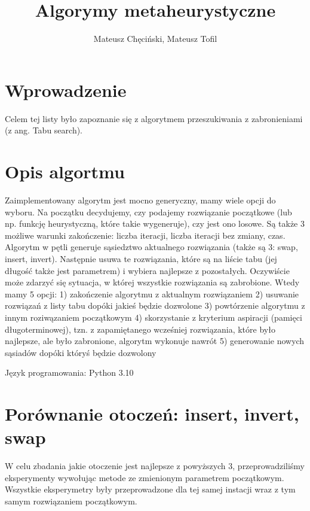 \documentclass{article}
\begin{document}
    \begin{titlepage}
        \title{Algorymy metaheurystyczne}
        \author{Mateusz Chęciński, Mateusz Tofil}
        \maketitle
    \end{titlepage}

    \section{Wprowadzenie}

    Celem tej listy było zapoznanie się z algorytmem przeszukiwania z
    zabronieniami (z ang. Tabu search). 

    \section{Opis algortmu}

   Zaimplementowany algorytm jest mocno generyczny, mamy wiele opcji do wyboru.
   Na początku decydujemy, czy podajemy rozwiązanie początkowe 
   (lub np. funkcję heurystyczną, które takie wygeneruje), czy jest 
   ono losowe. Są także 3 możliwe warunki zakończenie: 
   liczba iteracji, liczba iteracji bez zmiany, czas.
   Algorytm w pętli generuje sąsiedztwo aktualnego rozwiązania
   (także są 3: swap, insert, invert). Następnie usuwa te rozwiązania,
   które są na liście tabu (jej długość także jest parametrem) i wybiera
   najlepsze z pozostałych. Oczywiście może zdarzyć się sytuacja, w której
   wszystkie rozwiązania są zabrobione. Wtedy mamy 5 opcji: 
   1) zakończenie algorytmu z aktualnym rozwiązaniem
   2) usuwanie rozwiązań z listy tabu dopóki jakieś będzie dozwolone
   3) powtórzenie algorytmu z innym roziwązaniem początkowym
   4) skorzystanie z kryterium aspiracji (pamięci długoterminowej), tzn.
   z zapamiętanego wcześniej rozwiązania, które było najlepsze, ale było zabronione,
   algorytm wykonuje nawrót
   5) generowanie nowych sąsiadów dopóki któryś będzie dozwolony
    

    \noindent Język programowania: Python 3.10

    \section{Porównanie otoczeń: insert, invert, swap}

    W celu zbadania jakie otoczenie jest najlepsze z
    powyższych 3, przeprowadziliśmy eksperymenty wywołując
    metode ze zmienionym parametrem początkowym. Wszystkie
    eksperymetry były przeprowadzone dla tej samej instacji
    wraz z tym samym rozwiązaniem początkowym.
\end{document}
